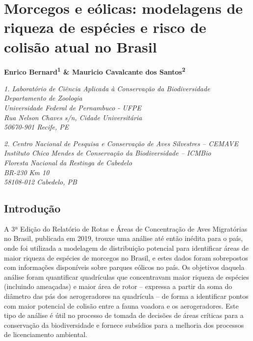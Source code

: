 \documentclass[
  oneside]{scrbook}
\begin{document}
\hypertarget{morcegos-e-euxf3licas-modelagens-de-riqueza-de-espuxe9cies-e-risco-de-colisuxe3o-atual-no-brasil}{%
\chapter{Morcegos e eólicas: modelagens de riqueza de espécies e risco de colisão atual no Brasil}\label{morcegos-e-euxf3licas-modelagens-de-riqueza-de-espuxe9cies-e-risco-de-colisuxe3o-atual-no-brasil}}

\pagestyle{headings}

\textbf{Enrico Bernard\textsuperscript{1} \& Mauricio Cavalcante dos Santos\textsuperscript{2}}

\emph{1. Laboratório de Ciência Aplicada à Conservação da Biodiversidade}\\
\emph{Departamento de Zoologia}\\
\emph{Universidade Federal de Pernambuco - UFPE}\\
\emph{Rua Nelson Chaves s/n, Cidade Universitária}\\
\emph{50670-901 Recife, PE}

\emph{2. Centro Nacional de Pesquisa e Conservação de Aves Silvestres -- CEMAVE}\\
\emph{Instituto Chico Mendes de Conservação da Biodiversidade -- ICMBio}\\
\emph{Floresta Nacional da Restinga de Cabedelo}\\
\emph{BR-230 Km 10}\\
\emph{58108-012 Cabedelo, PB}

\hypertarget{introduuxe7uxe3o}{%
\section{Introdução}\label{introduuxe7uxe3o}}

A 3ª Edição do Relatório de Rotas e Áreas de Concentração de Aves Migratórias no Brasil, publicada em 2019, trouxe uma análise até então inédita para o país, onde foi utilizada a modelagem de distribuição potencial para identificar áreas de maior riqueza de espécies de morcegos no Brasil, e estes dados foram sobrepostos com informações disponíveis sobre parques eólicos no país. Os objetivos daquela análise foram quantificar quadrículas que concentravam maior riqueza de espécies (incluindo ameaçadas) e maior área de rotor -- expressa a partir da soma do diâmetro das pás dos aerogeradores na quadrícula -- de forma a identificar pontos com maior potencial de colisão entre a fauna voadora e os aerogeradores. Este tipo de análise é útil no processo de tomada de decisões de áreas críticas para a conservação da biodiversidade e fornece subsídios para a melhoria dos processos de licenciamento ambiental.
\end{document}
